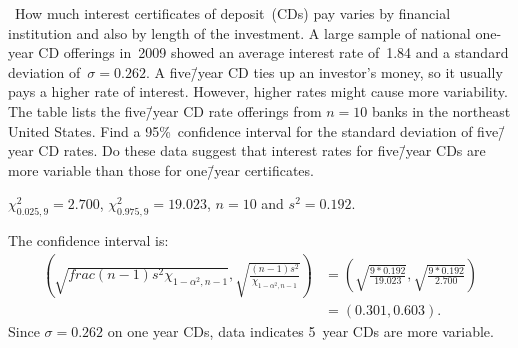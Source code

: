 \begin{problem}
  ~How much interest certificates of deposit~(CDs) pay varies by financial institution and also by length of the investment.  A large sample of national one-year CD offerings in~2009 showed an average interest rate of~1.84 and a standard deviation of~${\sigma  = 0.262}$.  A five\=/year CD ties up an investor's money, so it usually pays a higher rate of interest.  However, higher rates might cause more variability.  The table lists the five\=/year CD rate offerings from ${n = 10}$ banks in the northeast United States.  Find a 95\%~confidence interval for the standard deviation of five\=/year CD rates.  Do these data suggest that interest rates for five\=/year CDs are more variable than those for one\=/year certificates.
\end{problem}

${\chi_{0.025,9}^2 = 2.700}$, ${\chi_{0.975,9}^2 = 19.023}$, ${n =10}$ and ${s^2 = 0.192}$.

The confidence interval is:
\begin{align}
  \left(\sqrt{frac{(n-1)s^2}{\chi_{1-\alpha^2,n-1}}},\sqrt{\frac{(n-1)s^2}{\chi_{1-\alpha^2,n-1}}}\right) &= \left(\sqrt{\frac{9 * 0.192}{19.023}}, \sqrt{\frac{9 * 0.192}{2.700}}\right) \\
                                                                                                          &= \left(0.301,0.603\right)\text{.}
\end{align}
Since ${\sigma = 0.262}$ on one year CDs, data indicates 5~year CDs are more variable.

